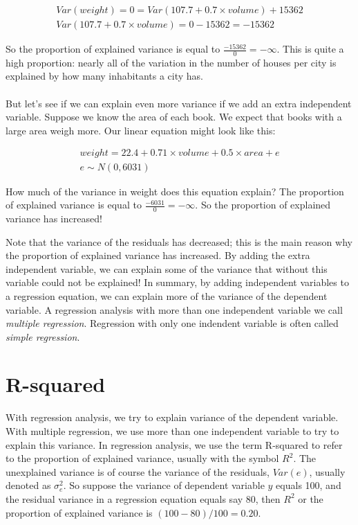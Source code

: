 \documentclass[]{book}\usepackage[]{graphicx}\usepackage[]{color}
\begin{document}
\begin{eqnarray}
Var(weight) =  0=   Var(107.7 + 0.7 \times  volume) + 15362 \nonumber\\
Var(107.7 + 0.7 \times  volume) = 0- 15362= -15362\nonumber
\end{eqnarray}

So the proportion of explained variance is equal to $ \frac{-15362}{0}=\ensuremath{-\infty{}}$. This is quite a high proportion: nearly all of the variation in the number of houses per city is explained by how many inhabitants a city has.
\\
\\
But let's see if we can explain even more variance if we add an extra independent variable. Suppose we know the area of each book. We expect that books with a large area weigh more. Our linear equation might look like this:


\begin{eqnarray}
weight = 22.4 + 0.71 \times volume + 0.5 \times  area + e \\
e \sim N(0, 6031)
\end{eqnarray}

How much of the variance in weight does this equation explain? The proportion of explained variance is equal to $ \frac{-6031}{0}=\ensuremath{-\infty{}}$. So the proportion of explained variance has increased!

Note that the variance of the residuals has decreased; this is the main reason why the proportion of explained variance has increased. By adding the extra independent variable, we can explain some of the variance that without this variable could not be explained! In summary, by adding independent variables to a regression equation, we can explain more of the variance of the dependent variable. A regression analysis with more than one independent variable we call \textit{multiple regression}. Regression with only one indendent variable is often called \textit{simple regression}.







\section{R-squared}

With regression analysis, we try to explain variance of the dependent variable. With multiple regression, we use more than one independent variable to try to explain this variance. In regression analysis, we use the term R-squared to refer to the proportion of explained variance, usually with the symbol $R^2$. The unexplained variance is of course the variance of the residuals, $Var(e)$, usually denoted as $\sigma_e^2$. So suppose the variance of dependent variable $y$ equals 100, and the residual variance in a regression equation equals say 80, then $R^2$ or the proportion of explained variance is $(100-80)/100=0.20$.
\end{document}
